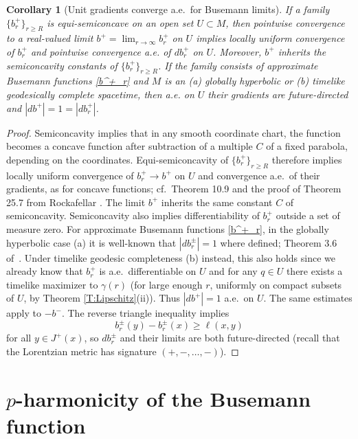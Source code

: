 \documentclass[12pt]{amsart}
\newtheorem{corollary}[theorem]{Corollary}
\begin{document}
\begin{corollary}[{Unit gradients converge a.e.\ for Busemann limits}
]\label{C:semiconcave}
If a family $\{b^+_r\}_{r \ge R}$ is equi-semiconcave on an open set $U \subset M$, %
then pointwise convergence to a real-valued limit $b^+=\lim_{r\to \infty} b^+_r$ on $U$
implies locally uniform convergence of $b^+_r$ and pointwise convergence a.e. of $db^+_r$ on $U$.  Moreover, $b^+$ inherits the semiconcavity constants of 
$\{b^+_r\}_{r \ge R}$.  If the family consists of approximate Busemann functions
\eqref{b^+_r} and $M$ is an (a) globally hyperbolic or (b) timelike geodesically complete spacetime, then a.e. on $U$ their gradients are future-directed and $|db^+|=1=|db^+_r|$.
\end{corollary}

\begin{proof}
Semiconcavity implies that in any smooth coordinate chart,  the function becomes a concave function after subtraction of a multiple $C$ of a fixed parabola, depending on the coordinates.
Equi-semiconcavity of $\{b^+_r\}_{r \ge R}$ 
therefore implies locally uniform convergence of $b^+_r \to b^+$ on $U$ and convergence a.e.\ of their gradients,
as for concave functions; cf.\ Theorem 10.9 and the proof of Theorem 25.7 from Rockafellar \cite{Rockafellar70}.
The limit $b^+$ inherits the same constant $C$ of semiconcavity.
Semiconcavity also implies differentiability of $b^+_r$ outside a set of measure zero.
For approximate Busemann functions \eqref{b^+_r}, in the globally hyperbolic case (a)
it is well-known that $|db^\pm_r|=1$ where defined; Theorem 3.6 of~\cite{McCann20}. %
{Under timelike geodesic completeness (b) instead,} this also holds since we already know that $b_r^+$ is a.e.\ differentiable on $U$ and for any $q \in U$ there exists a timelike maximizer to $\gamma(r)$ (for large enough $r$, uniformly on compact subsets of $U$, {by Theorem
\ref{T:Lipschitz}(ii)}).
Thus $|db^+|=1$ a.e.\ on $U$.  The same estimates apply to $-b^-$.
The reverse triangle inequality implies 
\begin{equation}\label{1-steep}
b^\pm_r(y) - b^\pm_r(x) \ge \ell(x,y)
\end{equation}
for all $y \in J^+(x)$,  so $db^\pm_r$ and their limits are both future-directed (recall that the Lorentzian metric has signature $(+,-,\dots,-)$).
\end{proof}


\section{$p$-harmonicity of the Busemann function}
\end{document}
